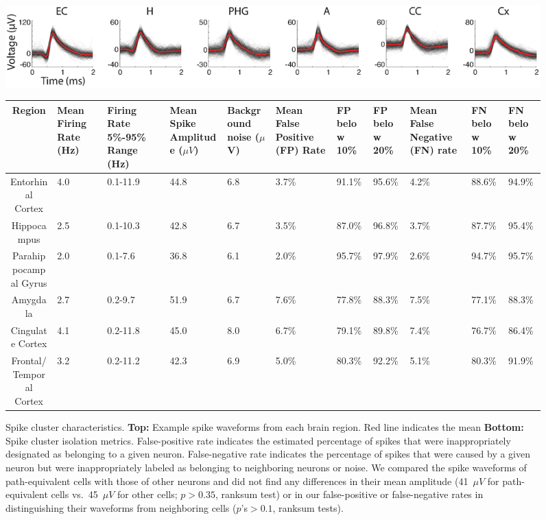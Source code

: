 	
\clearpage
\begin{figure}
\centering
\includegraphics[width=.99\textwidth]{./tex/linearGrids/figs/waveforms}
\scriptsize	
 \begin{tabular}{|c|C{.5cm}|C{1cm}|C{.7cm}|C{.65cm}|C{1cm}|C{.8cm}|C{.8cm}|C{.8cm}|C{.8cm}|C{.8cm}|}
\hline
Region &Mean Firing Rate (Hz) &Firing Rate 5\%-95\% Range (Hz) &Mean Spike Amplitude ($\mu{}V$) &Background noise  ($\mu{}$V) &Mean False Positive (FP) Rate &FP below 10\% &FP below 20\% &Mean False Negative (FN) rate &FN below 10\% &FN below 20\%\\\hline
Entorhinal Cortex &4.0 &0.1-11.9 &44.8 &6.8 &3.7\% &91.1\% &95.6\% &4.2\% &88.6\% &94.9\%\\
Hippocampus &2.5 &0.1-10.3 &42.8 &6.7 &3.5\% &87.0\% &96.8\% &3.7\% &87.7\% &95.4\%\\
Parahippocampal Gyrus &2.0 &0.1-7.6 &36.8 &6.1 &2.0\% &95.7\% &97.9\% &2.6\% &94.7\% &95.7\%\\
Amygdala &2.7 &0.2-9.7 &51.9 &6.7 &7.6\% &77.8\% &88.3\% &7.5\% &77.1\% &88.3\%\\
Cingulate Cortex &4.1 &0.2-11.8 &45.0 &8.0 &6.7\% &79.1\% &89.8\% &7.4\% &76.7\% &86.4\%\\
Frontal/Temporal Cortex &3.2 &0.2-11.2 &42.3 &6.9 &5.0\% &80.3\% &92.2\% &5.1\% &80.3\% &91.9\%\\
\hline
\end{tabular}
\caption[Spike cluster characteristics]{Spike cluster characteristics. \textbf{Top:} Example spike waveforms from each brain region. Red line indicates the mean \textbf{Bottom:} Spike cluster isolation metrics. False-positive rate indicates the estimated percentage of spikes that were inappropriately designated as belonging to a given neuron.  False-negative rate indicates the percentage of spikes that were caused by a given neuron but were inappropriately labeled as belonging to neighboring neurons or noise. We compared the spike waveforms of path-equivalent cells with those of other neurons and did not find any differences in their mean amplitude (41~$\mu V$ for path-equivalent cells vs.\ 45~$\mu V$ for other cells; $p>0.35$, ranksum test) or in our false-positive or false-negative rates in  distinguishing their waveforms from neighboring cells ($p$'s$>0.1$, ranksum tests).}
\label{fig:subSpikes}
\end{figure}	
	
